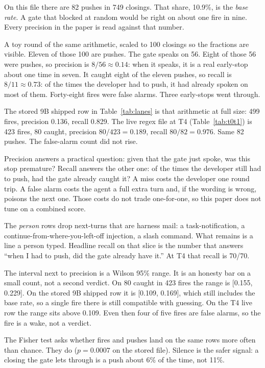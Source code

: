 On this file there are 82 pushes in 749 closings. That share, 10.9\%,
is the \emph{base rate}. A gate that blocked at random would be right
on about one fire in nine. Every precision in the paper is read
against that number.

A toy round of the same arithmetic, scaled to 100 closings so the
fractions are visible. Eleven of those 100 are pushes. The gate
speaks on 56. Eight of those 56 were pushes, so precision is
$8/56 \approx 0.14$: when it speaks, it is a real early-stop about
one time in seven. It caught eight of the eleven pushes, so recall
is $8/11 \approx 0.73$: of the times the developer had to push, it
had already spoken on most of them. Forty-eight fires were false
alarms. Three early-stops went through.

The stored 9B shipped row in Table~\ref{tab:lanes} is that arithmetic
at full size: 499 fires, precision 0.136, recall 0.829. The live
regex file at T4 (Table~\ref{tab:t0t1}) is 423 fires, 80 caught,
precision $80/423 = 0.189$, recall $80/82 = 0.976$. Same 82 pushes.
The false-alarm count did not rise.

Precision answers a practical question: given that the gate just
spoke, was this stop premature? Recall answers the other one: of the
times the developer still had to push, had the gate already caught
it? A miss costs the developer one round trip. A false alarm costs
the agent a full extra turn and, if the wording is wrong, poisons
the next one. Those costs do not trade one-for-one, so this paper
does not tune on a combined score.

The \emph{person} rows drop next-turns that are harness mail: a
task-notification, a continue-from-where-you-left-off injection, a
slash command. What remains is a line a person typed. Headline
recall on that slice is the number that answers ``when I had to
push, did the gate already have it.'' At T4 that recall is 70/70.

The interval next to precision is a Wilson 95\% range. It is an
honesty bar on a small count, not a second verdict. On 80 caught in
423 fires the range is [0.155, 0.229]. On the stored 9B shipped row
it is [0.109, 0.169], which still includes the base rate, so a
single fire there is still compatible with guessing. On the T4 live
row the range sits above 0.109. Even then four of five fires are
false alarms, so the fire is a wake, not a verdict.

The Fisher test asks whether fires and pushes land on the same rows
more often than chance. They do ($p = 0.0007$ on the stored file).
Silence is the safer signal: a closing the gate lets through is a
push about 6\% of the time, not 11\%.


